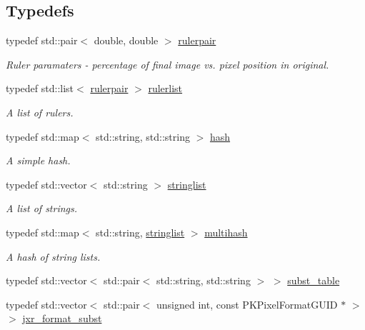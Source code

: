 \subsection*{Typedefs}
\begin{DoxyCompactItemize}
\item 
typedef std\+::pair$<$ double, double $>$ \hyperlink{namespace_photo_finish_aa05cab28f1c88a992ff7c1e36fbe9a74}{rulerpair}
\begin{DoxyCompactList}\small\item\em Ruler paramaters -\/ percentage of final image vs. pixel position in original. \end{DoxyCompactList}\item 
typedef std\+::list$<$ \hyperlink{namespace_photo_finish_aa05cab28f1c88a992ff7c1e36fbe9a74}{rulerpair} $>$ \hyperlink{namespace_photo_finish_a0abe5e95cf4de0f8f86aeabcf037082b}{rulerlist}
\begin{DoxyCompactList}\small\item\em A list of rulers. \end{DoxyCompactList}\item 
typedef std\+::map$<$ std\+::string, std\+::string $>$ \hyperlink{namespace_photo_finish_a5cfd59b3790dc7319dde2b4c0f96ac5a}{hash}
\begin{DoxyCompactList}\small\item\em A simple hash. \end{DoxyCompactList}\item 
typedef std\+::vector$<$ std\+::string $>$ \hyperlink{namespace_photo_finish_a5b181b4da2f4f053ba4db6273f62310d}{stringlist}
\begin{DoxyCompactList}\small\item\em A list of strings. \end{DoxyCompactList}\item 
typedef std\+::map$<$ std\+::string, \hyperlink{namespace_photo_finish_a5b181b4da2f4f053ba4db6273f62310d}{stringlist} $>$ \hyperlink{namespace_photo_finish_a6f41796f162687538b7da5c7a95e2d18}{multihash}
\begin{DoxyCompactList}\small\item\em A hash of string lists. \end{DoxyCompactList}\item 
typedef std\+::vector$<$ std\+::pair$<$ std\+::string, std\+::string $>$ $>$ \hyperlink{namespace_photo_finish_a99d3cfc086c8264e778255f5ef2b8b19}{subst\+\_\+table}
\item 
typedef std\+::vector$<$ std\+::pair$<$ unsigned int, const P\+K\+Pixel\+Format\+G\+U\+ID $\ast$ $>$ $>$ \hyperlink{namespace_photo_finish_a230739f3d4e738115f80e9a77e225959}{jxr\+\_\+format\+\_\+subst}
\end{DoxyCompactItemize}

